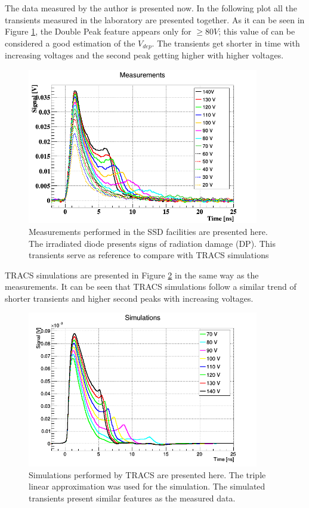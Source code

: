 The data measured by the author is presented now. In the following plot all the transients measured in the laboratory are presented together. As it can be seen in Figure \ref{fig:allTCT+}, the Double Peak feature appears only for \vias $ \geq 80 V$; this value of \vias can be considered a good estimation of the $V_{dep}$. The transients get shorter in time with increasing voltages and the second peak getting higher with higher voltages. 

\begin{figure}[H]
	\centering
	\includegraphics[width=0.9\textwidth]{c1.png}
	\caption{Measurements performed in the SSD facilities are presented here. The irradiated diode presents signs of radiation damage (DP). This transients serve as reference to compare with TRACS simulations}
	\label{fig:allTCT+}
\end{figure}
				
TRACS simulations are presented in Figure \ref{fig:allSims} in the same way as the measurements. It can be seen that TRACS simulations follow a similar trend of shorter transients and higher second peaks with increasing voltages.

\begin{figure}[H]
	\centering
	\centering
	\includegraphics[width=0.9\textwidth]{AllSims.png}
	\caption{Simulations performed by TRACS are presented here. The triple linear approximation was used for the simulation. The simulated transients present similar features as the measured data.}
	\label{fig:allSims}
\end{figure}

